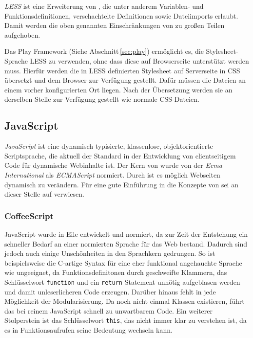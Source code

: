 \textit{LESS} ist eine Erweiterung von , die unter anderem  Variablen- und
Funktionsdefinitionen, verschachtelte Definitionen sowie  Dateiimports erlaubt. Damit werden die
oben genannten Einschränkungen von  zu großen Teilen aufgehoben.

Das Play Framework (Siehe Abschnitt\,\ref{sec:play}) ermöglicht es, die Stylesheet-Sprache
LESS zu verwenden, ohne dass diese auf Browserseite unterstützt werden muss. Hierfür
werden die in  LESS definierten Stylesheet auf Serverseite in CSS übersetzt  und
dem Browser zur Verfügung gestellt. Dafür müssen die Dateien an einem vorher konfigurierten Ort
liegen. Nach der Übersetzung werden sie an derselben Stelle zur Verfügung gestellt wie normale
CSS-Dateien.

\subsection{JavaScript}

\textit{JavaScript} ist eine dynamisch typisierte, klassenlose, objektorientierte Scriptsprache, die
aktuell der Standard in der Entwicklung von clientseitigem Code für dynamische Webinhalte ist. Der
Kern von  wurde von der \textit{Ecma International} als \textit{ECMAScript} normiert. Durch
 ist es möglich Webseiten dynamisch zu verändern. Für eine gute Einführung in die Konzepte
von  sei an dieser Stelle auf \cite{js} verwiesen.

\subsubsection{CoffeeScript}
\label{sec:coffeescript}

JavaScript wurde in Eile entwickelt und normiert, da zur Zeit der Entstehung ein schneller Bedarf an
einer normierten Sprache für das Web bestand. Dadurch sind jedoch auch einige Unschönheiten in den
Sprachkern gedrungen. So ist beispielsweise die C-artige Syntax für eine eher funktional angehauchte
Sprache wie  ungeeignet, da Funktionsdefinitonen durch geschweifte Klammern, das
Schlüsselwort \texttt{function} und ein \texttt{return} Statement unnötig aufgeblasen werden und
damit unleserlicheren Code erzeugen. Darüber hinaus fehlt in  jede Möglichkeit der
Modularisierung. Da noch nicht einmal Klassen existieren, führt das bei reinem JavaScript schnell zu
unwartbarem Code. Ein weiterer Stolperstein ist das Schlüsselwort \texttt{this}, das nicht immer
klar zu verstehen ist, da es in Funktionsaufrufen seine Bedeutung wechseln kann.

